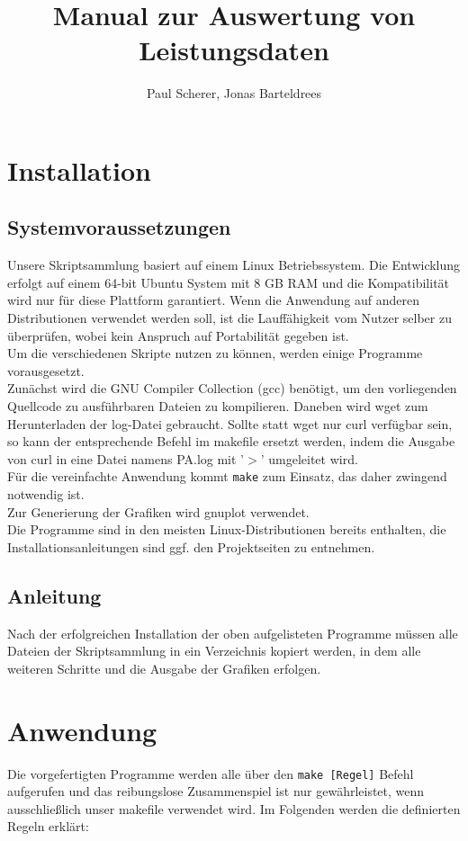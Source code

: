 \documentclass[a4 paper, 12 pt]{paper}
\title{Manual zur Auswertung von Leistungsdaten}
\author{Paul Scherer, Jonas Barteldrees}
\begin{document}
\maketitle
\tableofcontents
\thispagestyle{empty}
\newpage
\setcounter{page}{1}
\section{Installation}
	\subsection{Systemvoraussetzungen}
		Unsere Skriptsammlung basiert auf einem Linux Betriebssystem. Die Entwicklung erfolgt auf einem 64-bit Ubuntu System mit 8 GB RAM und die Kompatibilität wird nur für diese Plattform garantiert. Wenn die Anwendung auf anderen Distributionen verwendet werden soll, ist die Lauffähigkeit vom Nutzer selber zu überprüfen, wobei kein Anspruch auf Portabilität gegeben ist.\\
		Um die verschiedenen Skripte nutzen zu können, werden einige Programme vorausgesetzt.\\Zunächst wird die GNU Compiler Collection (gcc) benötigt, um den vorliegenden Quellcode zu ausführbaren Dateien zu kompilieren. Daneben wird wget zum Herunterladen der log-Datei gebraucht. Sollte statt wget nur curl verfügbar sein, so kann der entsprechende Befehl im makefile ersetzt werden, indem die Ausgabe von curl in eine Datei namens PA.log mit '$>$' umgeleitet wird.\\Für die vereinfachte Anwendung kommt \verb|make| zum Einsatz, das daher zwingend notwendig ist.\\
		Zur Generierung der Grafiken wird gnuplot verwendet.\\Die Programme sind in den meisten Linux-Distributionen bereits enthalten, die Installationsanleitungen sind ggf. den Projektseiten zu entnehmen.
	\subsection{Anleitung}
		Nach der erfolgreichen Installation der oben aufgelisteten Programme müssen alle Dateien der Skriptsammlung in ein Verzeichnis kopiert werden, in dem alle weiteren Schritte und die Ausgabe der Grafiken erfolgen.
\section{Anwendung}
		Die vorgefertigten Programme werden alle über den \verb|make [Regel]| Befehl aufgerufen und das reibungslose Zusammenspiel ist nur gewährleistet, wenn ausschließlich unser makefile verwendet wird. Im Folgenden werden die definierten Regeln erklärt:
\end{document}
